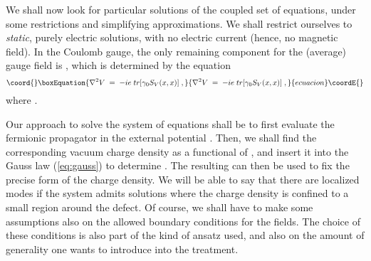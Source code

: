 \documentclass[a4paper,12pt]{article}
\begin{document}
{{We shall now look for particular solutions of the coupled set of
equations, under some restrictions and simplifying approximations.  We
shall restrict ourselves to {\em static\/}, purely electric solutions,
with no electric current (hence, no magnetic field). In the Coulomb
gauge, the only remaining component for the (average) gauge field is
\coordHE{}, which is determined by the equation
\begin{equation}\coord{}\boxEquation{
   \label{eq:gauss}
\nabla^2 V \;=\; - i e\; tr[\gamma_0 S_V(x,x)] \;,
}{
   \nabla^2 V \;=\; - i e\; tr[\gamma_0 S_V(x,x)] \;,
}{ecuacion}\coordE{}\end{equation}
where \coordHE{}.

Our approach to solve the system of equations shall be to first
evaluate the fermionic propagator in the external potential \coordHE{}. Then,
we shall find the corresponding vacuum charge density as a functional
of \coordHE{}, and insert it into the Gauss law (\ref{eq:gauss}) to determine
\coordHE{}. The resulting \coordHE{} can then be used to fix the precise form of the
charge density. We will be able to say that there are localized modes
if the system admits solutions where the charge density is confined to
a small region around the defect. Of course, we shall have to make
some assumptions also on the allowed boundary conditions for the
fields. The choice of these conditions is also part of the kind of
ansatz used, and also on the amount of generality one wants to
introduce into the treatment.

}}
\end{document}
